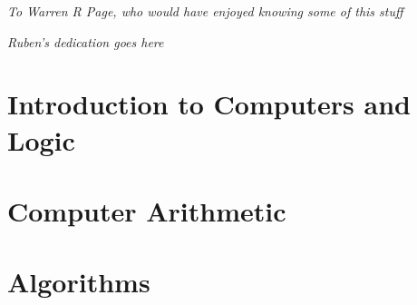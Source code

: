 \documentclass[letterpaper,10pt,extrafontsizesmtwoside,onecolumn,openright,fleqn]{memoir}
\begin{document}
\endgroup

\clearpage

\vspace*{\fill}

\begin{center}
\normalsize\textsf{\emph{To Warren R Page, who would have enjoyed knowing some of this stuff}}\par
\end{center}

\begin{center}
\normalsize\textsf{\emph{Ruben's dedication goes here}}\par
\end{center}

\vspace*{\fill}

\cleardoublepage

\pagestyle{headings}

\setupshorttoc
\tableofcontents
\clearpage
\setupparasubsecs
\setupmaintoc
\tableofcontents
\clearpage
\listoffigures
\clearpage
\listofasides
\clearpage


\mainmatter

\raggedbottom

\part{Introduction to Computers and Logic}











\part{Computer Arithmetic}







\part{Algorithms}
\end{document}
